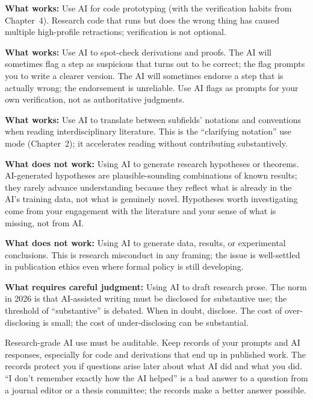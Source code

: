 \documentclass[11pt]{book}
\begin{document}
\textbf{What works:} Use AI for code prototyping (with the verification habits from Chapter~4). Research code that runs but does the wrong thing has caused multiple high-profile retractions; verification is not optional.

\textbf{What works:} Use AI to spot-check derivations and proofs. The AI will sometimes flag a step as suspicious that turns out to be correct; the flag prompts you to write a clearer version. The AI will sometimes endorse a step that is actually wrong; the endorsement is unreliable. Use AI flags as prompts for your own verification, not as authoritative judgments.

\textbf{What works:} Use AI to translate between subfields' notations and conventions when reading interdisciplinary literature. This is the ``clarifying notation'' use mode (Chapter~2); it accelerates reading without contributing substantively.

\textbf{What does not work:} Using AI to generate research hypotheses or theorems. AI-generated hypotheses are plausible-sounding combinations of known results; they rarely advance understanding because they reflect what is already in the AI's training data, not what is genuinely novel. Hypotheses worth investigating come from your engagement with the literature and your sense of what is missing, not from AI.

\textbf{What does not work:} Using AI to generate data, results, or experimental conclusions. This is research misconduct in any framing; the issue is well-settled in publication ethics even where formal policy is still developing.

\textbf{What requires careful judgment:} Using AI to draft research prose. The norm in 2026 is that AI-assisted writing must be disclosed for substantive use; the threshold of ``substantive'' is debated. When in doubt, disclose. The cost of over-disclosing is small; the cost of under-disclosing can be substantial.

\begin{watchout}
Research-grade AI use must be auditable. Keep records of your prompts and AI responses, especially for code and derivations that end up in published work. The records protect you if questions arise later about what AI did and what you did. ``I don't remember exactly how the AI helped'' is a bad answer to a question from a journal editor or a thesis committee; the records make a better answer possible.
\end{watchout}
\end{document}
